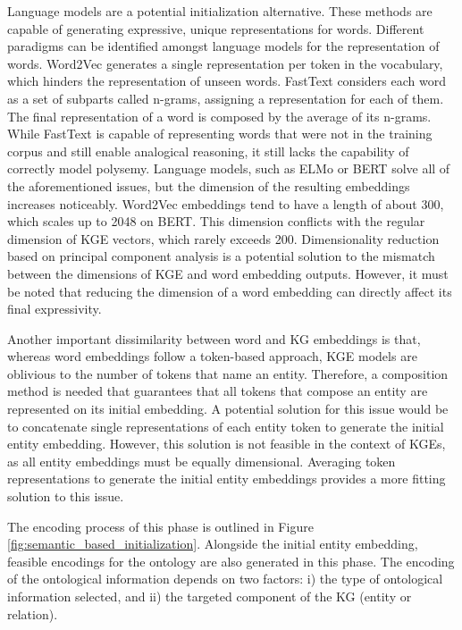 Language models are a potential initialization alternative. These methods are capable of generating expressive, unique representations for words. Different paradigms can be identified amongst language models for the representation of words. Word2Vec \citep{word2vec} generates a single representation per token in the vocabulary, which hinders the representation of unseen words. FastText \citep{fasttext1,fasttext2} considers each word as a set of subparts called n-grams, assigning a representation for each of them. The final representation of a word is composed by the average of its n-grams. While FastText is capable of representing words that were not in the training corpus and still enable analogical reasoning, it still lacks the capability of correctly model polysemy. Language models, such as ELMo \citep{elmo} or BERT \citep{bert} solve all of the aforementioned issues, but the dimension of the resulting embeddings increases noticeably. Word2Vec embeddings tend to have a length of about 300, which scales up to 2048 on BERT. This dimension conflicts with the regular dimension of KGE vectors, which rarely exceeds 200. Dimensionality reduction based on principal component analysis is a potential solution to the mismatch between the dimensions of KGE and word embedding outputs. However, it must be noted that reducing the dimension of a word embedding can directly affect its final expressivity. 

Another important dissimilarity between word and KG embeddings is that, whereas word embeddings follow a token-based approach, KGE models are oblivious to the number of tokens that name an entity. Therefore, a composition method is needed that guarantees that all tokens that compose an entity are represented on its initial embedding. A potential solution for this issue would be to concatenate single representations of each entity token to generate the initial entity embedding. However, this solution is not feasible in the context of KGEs, as all entity embeddings must be equally dimensional. Averaging token representations to generate the initial entity embeddings provides a more fitting solution to this issue.

The encoding process of this phase is outlined in Figure \ref{fig:semantic_based_initialization}. Alongside the initial entity embedding, feasible encodings for the ontology are also generated in this phase. The encoding of the ontological information depends on two factors: i) the type of ontological information selected, and ii) the targeted component of the KG (entity or relation). 

